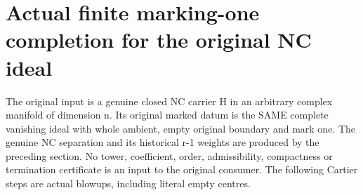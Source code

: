 \section{Actual finite marking-one completion for the original NC ideal}
\label{sec:hironaka-normal-crossings-finite-marked-completion}

The original input is a genuine closed NC carrier H in an arbitrary complex
manifold of dimension n. Its original marked datum is the SAME complete
vanishing ideal with whole ambient, empty original boundary and mark one.
The genuine NC separation and its historical r-1 weights are produced by the
preceding section. No tower, coefficient, order, admissibility, compactness or
termination certificate is an input to the original consumer. The following
Cartier steps are actual blowups, including literal empty centres.

